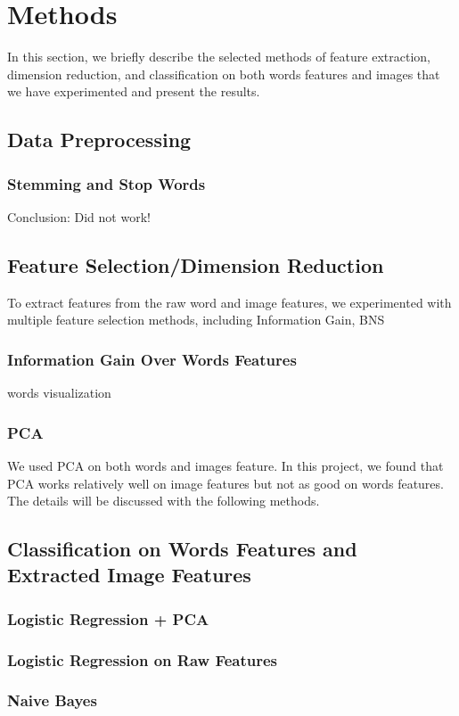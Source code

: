 \section{Methods}
In this section, we briefly describe the selected methods of feature extraction, dimension reduction, and classification on both words features and images that we have experimented and present the results. 

\subsection{Data Preprocessing}
\subsubsection{Stemming and Stop Words}
Conclusion: Did not work!

\subsection{Feature Selection/Dimension Reduction}
To extract features from the raw word and image features, we experimented with multiple feature selection methods, including Information Gain, BNS
\subsubsection{Information Gain Over Words Features}
words visualization
\subsubsection{PCA}
We used PCA on both words and images feature. In this project, we found that PCA works relatively well on image features but not as good on words features. The details will be discussed with the following methods.
\subsection{Classification on Words Features and Extracted Image Features}
\subsubsection{Logistic Regression + PCA}
\subsubsection{Logistic Regression on Raw Features}
\subsubsection{Naive Bayes}
